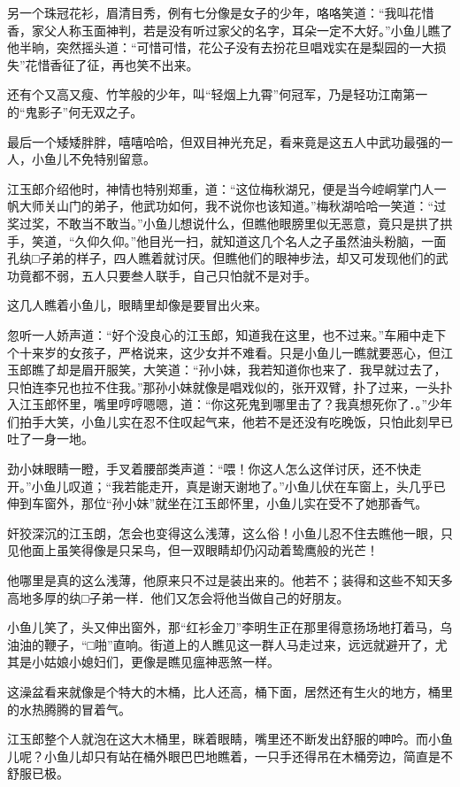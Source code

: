 \documentclass[12pt,oneside]{book}
\begin{document}
另一个珠冠花衫，眉清目秀，例有七分像是女子的少年，咯咯笑道：``我叫花惜香，家父人称玉面神判，若是没有听过家父的名字，耳朵一定不大好。''小鱼儿瞧了他半晌，突然摇头道：``可惜可惜，花公子没有去扮花旦唱戏实在是梨园的一大损失''花惜香征了征，再也笑不出来。

还有个又高又瘦、竹竿般的少年，叫``轻烟上九霄''何冠军，乃是轻功江南第一的``鬼影子''何无双之子。

最后一个矮矮胖胖，嘻嘻哈哈，但双目神光充足，看来竟是这五人中武功最强的一人，小鱼儿不免特别留意。

江玉郎介绍他时，神情也特别郑重，道：``这位梅秋湖兄，便是当今崆峒掌门人一帆大师关山门的弟子，他武功如何，我不说你也该知道。''梅秋湖哈哈一笑道：``过奖过奖，不敢当不敢当。''小鱼儿想说什么，但瞧他眼膀里似无恶意，竟只是拱了拱手，笑道，``久仰久仰。''他目光一扫，就知道这几个名人之子虽然油头粉脑，一面孔纨□子弟的样子，四人瞧着就讨厌。但瞧他们的眼神步法，却又可发现他们的武功竟都不弱，五人只要叁人联手，自己只怕就不是对手。

这几人瞧着小鱼儿，眼睛里却像是要冒出火来。

忽听一人娇声道：``好个没良心的江玉郎，知道我在这里，也不过来。''车厢中走下个十来岁的女孩子，严格说来，这少女并不难看。只是小鱼儿一瞧就要恶心，但江玉郎瞧了却是眉开服笑，大笑道：``孙小妹，我若知道你也来了．我早就过去了，只怕连李兄也拉不住我。''那孙小妹就像是唱戏似的，张开双臂，扑了过来，一头扑入江玉郎怀里，嘴里哼哼嗯嗯，道：``你这死鬼到哪里击了？我真想死你了．。''少年们拍手大笑，小鱼儿实在忍不住叹起气来，他若不是还没有吃晚饭，只怕此刻早已吐了一身一地。

劲小妹眼睛一瞪，手叉着腰部类声道：``喂！你这人怎么这佯讨厌，还不快走开。''小鱼儿叹道；``我若能走开，真是谢天谢地了。''小鱼儿伏在车窗上，头几乎已伸到车窗外，那位``孙小妹''就坐在江玉郎怀里，小鱼儿实在受不了她那香气。

奸狡深沉的江玉朗，怎会也变得这么浅薄，这么俗！小鱼儿忍不住去瞧他一眼，只见他面上虽笑得像是只呆鸟，但一双眼睛却仍闪动着鸷鹰般的光芒！

他哪里是真的这么浅薄，他原来只不过是装出来的。他若不；装得和这些不知天多高地多厚的纨□子弟一样．他们又怎会将他当做自己的好朋友。

小鱼儿笑了，头又伸出窗外，那``红衫金刀''李明生正在那里得意扬场地打着马，乌油油的鞭子，``□啪''直响。街道上的人瞧见这一群人马走过来，远远就避开了，尤其是小姑娘小媳妇们，更像是瞧见瘟神恶煞一样。

这澡盆看来就像是个特大的木桶，比人还高，桶下面，居然还有生火的地方，桶里的水热腾腾的冒着气。

江玉郎整个人就泡在这大木桶里，眯着眼睛，嘴里还不断发出舒服的呻吟。而小鱼儿呢？小鱼儿却只有站在桶外眼巴巴地瞧着，一只手还得吊在木桶旁边，简直是不舒服已极。
\end{document}
